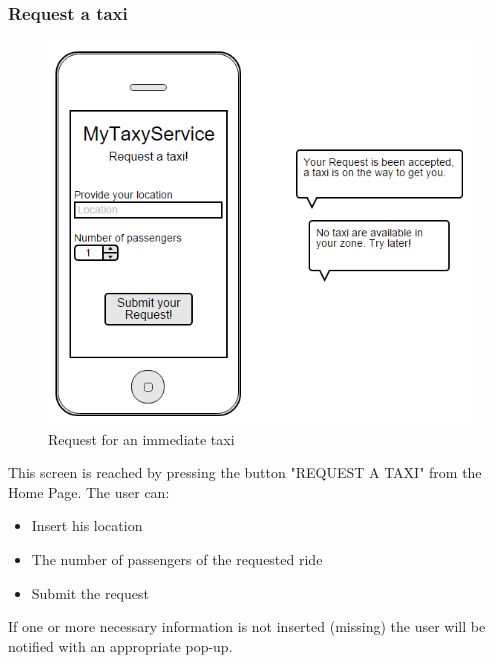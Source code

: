 \subsubsection{Request a taxi}
\begin{figure}[H]
\centering
\includegraphics[scale=0.6]{Images/taxi_request}
\caption{Request for an immediate taxi}
\end{figure}
This screen is reached by pressing the button "REQUEST A TAXI" from the Home Page. The user can:
\begin{itemize}
\item Insert his location
\item The number of passengers of the requested ride
\item Submit the request
\end{itemize} 
If one or more necessary information is not inserted (missing) the user will be notified with an appropriate pop-up.


